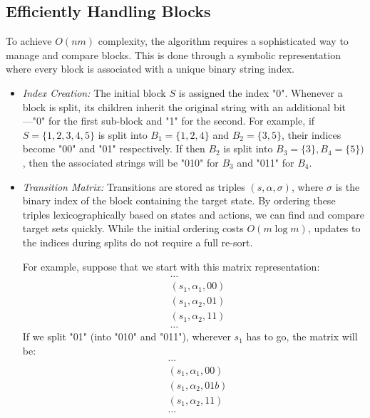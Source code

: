 \subsection{Efficiently Handling Blocks}
To achieve $O(nm)$ complexity, the algorithm requires a sophisticated way to manage and compare blocks. This is done through a symbolic representation where every block is associated with a unique binary string index.
\begin{itemize}
    \item \textit{Index Creation:} The initial block $S$ is assigned the index "0". Whenever a block is split, its children inherit the original string with an additional bit—"0" for the first sub-block and "1" for the second. For example, if $S = \{1, 2, 3, 4, 5\}$ is split into $B_1 = \{1, 2, 4\}$ and $B_2 = \{3, 5\}$, their indices become "00" and "01" respectively.  If then $B_2$ is split into $B_3 = \{3\}, B_4 = \{5\})$, then the associated strings will be "010" for $B_3$ and "011" for $B_4$.
    \item \textit{Transition Matrix:} Transitions are stored as triples $(s, \alpha, \sigma)$, where $\sigma$ is the binary index of the block containing the target state. By ordering these triples lexicographically based on states and actions, we can find and compare target sets quickly. While the initial ordering costs $O(m \log m)$, updates to the indices during splits do not require a full re-sort.

    For example, suppose that we start with this matrix representation:
    \begin{align*}
        &\ldots\\
        &(s_1, \alpha_1, 00)\\
        &(s_1, \alpha_2, 01)\\
        &(s_1, \alpha_2, 11)\\
        &\ldots
    \end{align*}
    If we split "01" (into "010" and "011"), wherever $s_1$ has to go, the matrix will be:
    \begin{align*}
        &\ldots\\
        &(s_1, \alpha_1, 00)\\
        &(s_1, \alpha_2, 01b)\\
        &(s_1, \alpha_2, 11)\\
        &\ldots
    \end{align*}
\end{itemize}

